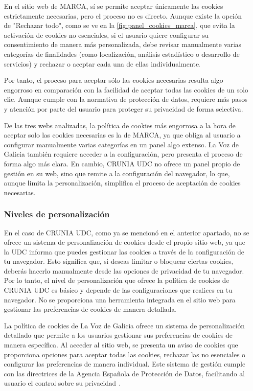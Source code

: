 En el sitio web de MARCA, sí se permite aceptar únicamente las cookies estrictamente necesarias, pero el proceso no es directo. Aunque existe la opción de "Rechazar todo", como se ve en la \ref{fig:panel_cookies_marca}, que evita la activación de cookies no esenciales, si el usuario quiere configurar su consentimiento de manera más personalizada, debe revisar manualmente varias categorías de finalidades (como localización, análisis estadístico o desarrollo de servicios) y rechazar o aceptar cada una de ellas individualmente. 

Por tanto, el proceso para aceptar sólo las cookies necesarias resulta algo engorroso en comparación con la facilidad de aceptar todas las cookies de un solo clic. Aunque cumple con la normativa de protección de datos, requiere más pasos y atención por parte del usuario para proteger su privacidad de forma selectiva. 


De las tres webs analizadas, la política de cookies más engorrosa a la hora de aceptar solo las cookies necesarias es la de MARCA, ya que obliga al usuario a configurar manualmente varias categorías en un panel algo extenso. La Voz de Galicia también requiere acceder a la configuración, pero presenta el proceso de forma algo más clara. En cambio, CRUNIA UDC no ofrece un panel propio de gestión en su web, sino que remite a la configuración del navegador, lo que, aunque limita la personalización, simplifica el proceso de aceptación de cookies necesarias. 


\subsubsection{Niveles de personalización}

En el caso de CRUNIA UDC, como ya se mencionó en el anterior apartado, no se ofrece un sistema de personalización de cookies desde el propio sitio web, ya que la UDC informa que puedes gestionar las cookies a través de la configuración de tu navegador. Esto significa que, si deseas limitar o bloquear ciertas cookies, deberás hacerlo manualmente desde las opciones de privacidad de tu navegador. Por lo tanto, el nivel de personalización que ofrece la política de cookies de CRUNIA UDC es básico y depende de las configuraciones que realices en tu navegador. No se proporciona una herramienta integrada en el sitio web para gestionar las preferencias de cookies de manera detallada. 

 
La política de cookies de La Voz de Galicia ofrece un sistema de personalización detallado que permite a los usuarios gestionar sus preferencias de cookies de manera específica. Al acceder al sitio web, se presenta un aviso de cookies que proporciona opciones para aceptar todas las cookies, rechazar las no esenciales o configurar las preferencias de manera individual. Este sistema de gestión cumple con las directrices de la Agencia Española de Protección de Datos, facilitando al usuario el control sobre su privacidad \cite{AEPD}.

